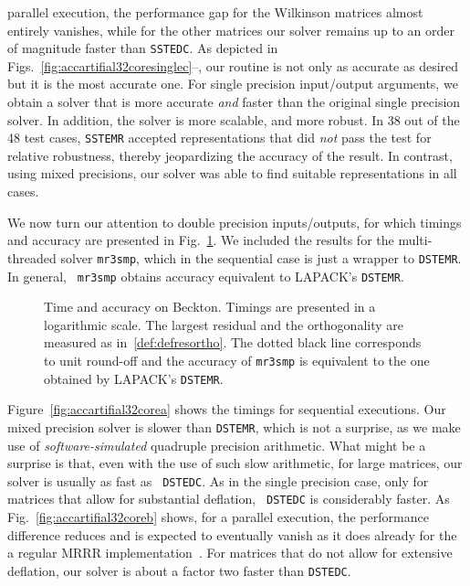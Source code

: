 \documentclass[final]{siamltex}
\begin{document}
parallel execution, the performance gap for the Wilkinson matrices almost
entirely vanishes, while for the other matrices our solver remains up to an order of magnitude
faster than {\tt SSTEDC}.  
As depicted in Figs.~\ref{fig:accartifial32coresinglec}--,
our routine is not only as accurate as
desired but it is the most accurate one. For single precision input/output
arguments, we obtain a solver that is more accurate {\it and} faster than the
original single precision solver. In addition,
the solver is more scalable, and more robust. In 38 out of the 48 test cases,
{\tt SSTEMR} accepted representations that did {\em not} pass the test for
relative robustness, thereby jeopardizing the accuracy of the
result. In contrast, using mixed precisions, our solver was able to find
suitable representations in all cases.

We now turn our attention to double precision inputs/outputs, for which timings and
accuracy are presented in Fig.~\ref{fig:accartifial32core}. 
We included the results for the multi-threaded solver {\tt mr3smp}, which 
in the sequential case is just a wrapper to {\tt DSTEMR}. In general,  {\tt
  mr3smp} obtains accuracy equivalent to 
LAPACK's {\tt DSTEMR}.  
\begin{figure}[tbh]
   \centering   
    

    
   \caption{
     Time and accuracy on {\sc Beckton}. Timings are presented in a
     logarithmic scale. The largest residual and the orthogonality are
     measured as in~\eqref{def:defresortho}. The dotted black line
     corresponds to unit round-off  and the accuracy of {\tt mr3smp} is
     equivalent to the one obtained by LAPACK's {\tt DSTEMR}.   
   }
   \label{fig:accartifial32core}
\end{figure}

Figure~\ref{fig:accartifial32corea} shows the timings for 
sequential executions. Our mixed precision solver is slower than {\tt DSTEMR}, which is not
a surprise, as we make use of {\it software-simulated} quadruple precision
arithmetic. What might be a surprise is that, even with the use of such slow
arithmetic, for large matrices, our solver is usually as fast as {\tt
  DSTEDC}. As in the single precision case, only for matrices that allow
for substantial deflation, {\tt
  DSTEDC} is considerably faster. As Fig.~\ref{fig:accartifial32coreb}
shows, for a parallel execution, the performance difference reduces and is
expected to eventually vanish as it does already for the a regular MRRR
implementation~\cite{EleMRRR}. For matrices that do not allow for extensive
deflation, our solver is about a factor two faster than {\tt DSTEDC}. 
\end{document}
